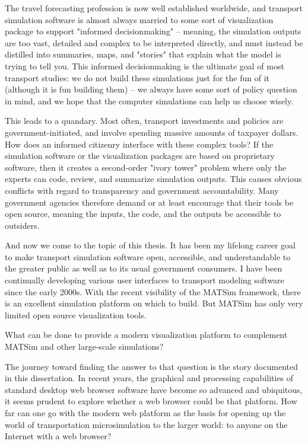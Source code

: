The travel forecasting profession is now well established worldwide, and transport simulation software is almost always married to some sort of visualization package to support "informed decisionmaking" -- meaning, the simulation outputs are too vast, detailed and complex to be interpreted directly, and must instead be distilled into summaries, maps, and "stories" that explain what the model is trying to tell you. This informed decisionmaking is the ultimate goal of most transport studies: we do not build these simulations just for the fun of it (although it is fun building them) -- we always have some sort of policy question in mind, and we hope that the computer simulations can help us choose wisely.

This leads to a quandary. Most often, transport investments and policies are government-initiated, and involve spending massive amounts of taxpayer dollars. How does an informed citizenry interface with these complex tools? If the simulation software or the visualization packages are based on proprietary software, then it creates a second-order "ivory tower" problem where only the experts can code, review, and summarize simulation outputs. This causes obvious conflicts with regard to transparency and government accountability. Many government agencies therefore demand or at least encourage that their tools be open source, meaning the inputs, the code, and the outputs be accessible to outsiders.

And now we come to the topic of this thesis. It has been my lifelong career goal to make transport simulation software open, accessible, and understandable to the greater public as well as to its usual government consumers. I have been continually developing various user interfaces to transport modeling software since the early 2000s. With the recent visibility of the \gls{MATSim} framework, there is an excellent simulation platform on which to build. But MATSim has only very limited open source visualization tools.

What can be done to provide a modern visualization platform to complement MATSim and other large-scale simulations?

The journey toward finding the answer to that question is the story documented in this dissertation. In recent years, the graphical and processing capabilities of standard desktop web browser software have become so advanced and ubiquitous, it seems prudent to explore whether a web browser could be that platform. How far can one go with the modern web platform as the basis for opening up the world of transportation microsimulation to the larger world: to anyone on the Internet with a web browser?

